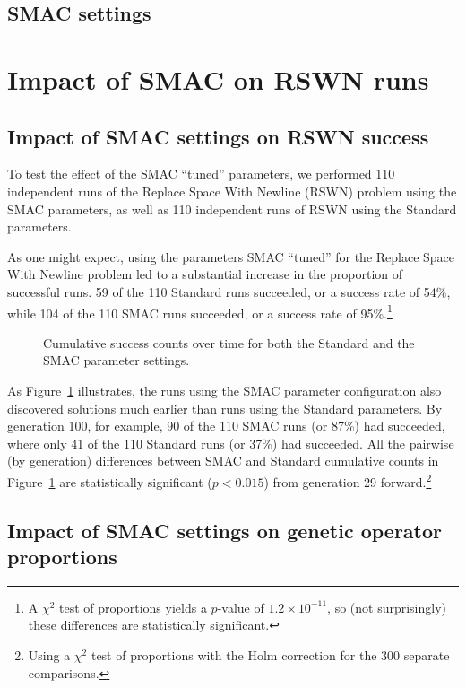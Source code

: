 \subsection{SMAC settings}
\label{sec:SMACsettings}

\section{Impact of SMAC on RSWN runs}
\label{sec:SMACimpact}

\subsection{Impact of SMAC settings on RSWN success}
\label{sec:SMACsuccessRSWN}

To test the effect of the SMAC ``tuned'' parameters, we performed 110
independent runs of the Replace Space With Newline (RSWN) problem using the
SMAC parameters, as well as 110 independent runs of RSWN using the
Standard parameters.

As one might expect, using the parameters SMAC ``tuned'' for the
Replace Space With Newline problem led to a 
substantial increase in the proportion of successful runs. 59 of 
the 110 Standard runs succeeded, or a success rate of 54\%, while 104 of the
110 SMAC runs succeeded, or a success rate of 95\%.\footnote{A $\chi^2$ test of 
proportions yields a $p$-value of $1.2 \times 10^{-11}$, so (not surprisingly)
these differences are statistically significant.}

\begin{figure}
	\caption{Cumulative success counts over time for both the Standard
	and the SMAC parameter settings.}
	\label{fig:successGenerations}
\end{figure}

As Figure~\ref{fig:successGenerations} illustrates, the runs using the SMAC
parameter configuration also discovered solutions much earlier than runs using
the Standard parameters. By generation 100, for example, 90 of the 110 SMAC 
runs (or 87\%) had succeeded, where only 41 of the 110 Standard runs 
(or 37\%) had succeeded. All the pairwise (by generation) differences 
between SMAC and Standard cumulative counts in 
Figure~\ref{fig:successGenerations} are 
statistically significant ($p<0.015$)
from generation 29 forward.\footnote{Using a $\chi^2$ test of proportions 
	with the Holm correction for the 300 separate comparisons.}

\subsection{Impact of SMAC settings on genetic operator proportions}
\label{sec:SMACimpactRSWNops}

